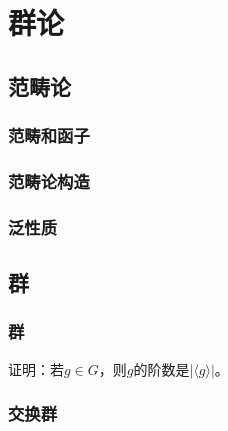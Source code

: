 \documentclass[../main.tex]{subfiles}
\begin{document}
\setcounter{chapter}{3}
\chapter{群论}
\section{范畴论}
\subsection{范畴和函子}
\subsection{范畴论构造}
\subsection{泛性质}
\section{群}
\subsection{群}
\begin{exercise}\label{exe:order_and_cyclic_subgroup}
证明：若$g\in G$，则$g$的阶数是$|\langle g\rangle|$。
\end{exercise}
\subsection{交换群}
\end{document}

